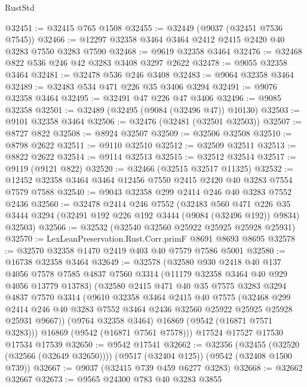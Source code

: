 \begin{lexlean}{RustStd}
\begin{coremodule}
@32451 := @32415 @765 @1508
@32455 := @32449 (@9037 (@32451 @7536 @7545))
@32466 := @12297 @32358 @3464 @3464 @2412 @2415 @2420 @40 @3283 @7550 @3283 @7590
@32468 := @9619 @32358 @3464
@32476 := @32468 @822 @536 @246 @42 @3283 @3408 @3297 @2622
@32478 := @9055 @32358 @3464
@32481 := @32478 @536 @246 @3408
@32483 := @9064 @32358 @3464
@32489 := @32483 @534 @471 @226 @35 @3406 @3294
@32491 := @9076 @32358 @3464
@32495 := @32491 @47 @226 @47 @3406
@32496 := @9085 @32358
@32501 := @32489 (@32495 (@9084 (@32496 @47)) @10130)
@32503 := @9101 @32358 @3464
@32506 := @32476 (@32481 (@32501 @32503))
@32507 := @8727 @822
@32508 := @8924 @32507
@32509 := @32506 @32508
@32510 := @8798 @2622
@32511 := @9110 @32510
@32512 := @32509 @32511
@32513 := @8822 @2622
@32514 := @9114 @32513
@32515 := @32512 @32514
@32517 := @9119 (@9121 @822)
@32520 := @32466 (@32515 @32517 @11325)
@32532 := @12452 @32358 @3464 @3464 @12456 @7550 @2415 @2420 @40 @3283 @7554 @7579 @7588
@32540 := @9043 @32358 @299 @2414 @246 @40 @3283 @7552 @2436
@32560 := @32478
    @2414
    @246
    @7552
    (@32483
      @560
      @471
      @226
      @35
      @3444
      @3294
      (@32491 @192 @226 @192 @3444 (@9084 (@32496 @192)) @9834)
      @32503)
@32566 := @32532 (@32540 @32560 @25922 @25925 @25928 @25931)
@32570 := LexLeanPreservation.Rust.Corr.primF @8691 @8693 @8695
@32578 := @32570 @32358 @1470 @2419 @403 @40 @7579 @7586 @5001
@32580 := @16738 @32358 @3464
@32649 := @32578
    (@32580
      @930
      @2418
      @40
      @137
      @4056
      @7578
      @7585
      @4837
      @7560
      @3314
      (@11179 @32358 @3464 @40 @929 @4056 @13779 @13783)
      (@32580
        @2415
        @471
        @40
        @35
        @7575
        @3283
        @3294
        @4837
        @7570
        @3314
        (@9610
          @32358
          @3464
          @2415
          @40
          @7575
          (@32468
            @299
            @2414
            @246
            @40
            @3283
            @7552
            @3464
            @2436
            @32560
            @25922
            @25925
            @25928
            @25931
            @9667))
        (@9764 @32358 @3464)
        @16869
        (@9542 (@16871 @7571 @3283)))
      @16869
      (@9542 (@16871 @7561 @7578)))
    @17524
    @17527
    @17530
    @17534
    @17539
@32650 := @9542 @17541
@32662 := @32356
    (@32455 (@32520 (@32566 (@32649 @32650))))
    (@9517 (@32404 @125))
    (@9542 (@32408 @1500 @739))
@32667 := @9037 (@32415 @739 @459 @6277 @3283)
@32668 := @32662 @32667
@32673 := @9565 @24300 @783 @40 @3283 @3855

\end{coremodule}
\end{lexlean}
